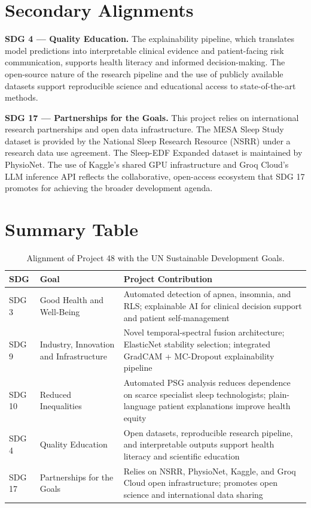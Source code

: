 \section*{Secondary Alignments}

\textbf{SDG 4 — Quality Education.}
The explainability pipeline, which translates model predictions into interpretable clinical evidence and patient-facing risk communication, supports health literacy and informed decision-making. The open-source nature of the research pipeline and the use of publicly available datasets support reproducible science and educational access to state-of-the-art methods.

\textbf{SDG 17 — Partnerships for the Goals.}
This project relies on international research partnerships and open data infrastructure. The MESA Sleep Study dataset is provided by the National Sleep Research Resource (NSRR) under a research data use agreement. The Sleep-EDF Expanded dataset is maintained by PhysioNet. The use of Kaggle's shared GPU infrastructure and Groq Cloud's LLM inference API reflects the collaborative, open-access ecosystem that SDG 17 promotes for achieving the broader development agenda.

\section*{Summary Table}

\begin{table}[h]
\centering
\caption{Alignment of Project 48 with the UN Sustainable Development Goals.}
\label{tab:sdg}
\begin{tabular}{p{1.2cm}p{4.5cm}p{8cm}}
\toprule
SDG & Goal & Project Contribution \\
\midrule
SDG 3 & Good Health and Well-Being & Automated detection of apnea, insomnia, and RLS; explainable AI for clinical decision support and patient self-management \\
SDG 9 & Industry, Innovation and Infrastructure & Novel temporal-spectral fusion architecture; ElasticNet stability selection; integrated GradCAM + MC-Dropout explainability pipeline \\
SDG 10 & Reduced Inequalities & Automated PSG analysis reduces dependence on scarce specialist sleep technologists; plain-language patient explanations improve health equity \\
SDG 4 & Quality Education & Open datasets, reproducible research pipeline, and interpretable outputs support health literacy and scientific education \\
SDG 17 & Partnerships for the Goals & Relies on NSRR, PhysioNet, Kaggle, and Groq Cloud open infrastructure; promotes open science and international data sharing \\
\bottomrule
\end{tabular}
\end{table}
